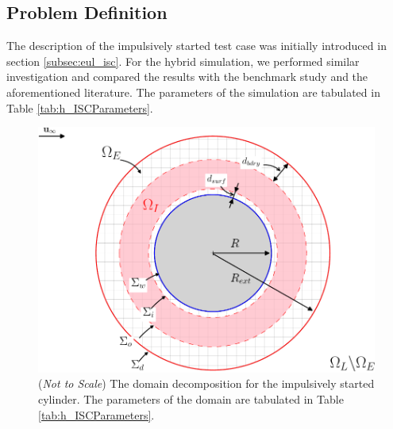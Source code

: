 %
%

\subsection{Problem Definition}

The description of the impulsively started test case was initially introduced in section \ref{subsec:eul_isc}. For the hybrid simulation, we performed similar investigation and compared the results with the benchmark study and the aforementioned literature. The parameters of the simulation are tabulated in Table \ref{tab:h_ISCParameters}. 

	\begin{figure}[H]
	\centering
	\includegraphics[width=0.6\linewidth]{./figures/validation/isc/hisc_dd-crop.pdf}
	\caption{(\textit{Not to Scale}) The domain decomposition for the impulsively started cylinder. The parameters of the domain are tabulated in Table \ref{tab:h_ISCParameters}.}
	\label{fig:hisc_dd}
	\end{figure}

